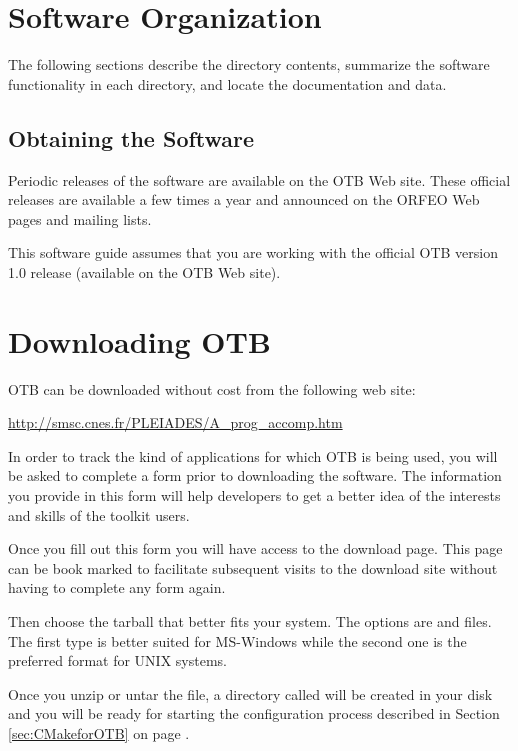 \section{Software Organization}
\label{sec:SoftwareOrganization}

The following sections describe the directory contents, summarize the
software functionality in each directory, and locate the documentation and
data.

\subsection{Obtaining the Software}
\label{sec:ObtainingTheSoftware}

Periodic releases of the software are available on the OTB Web
site. These official releases are available a few times a year and
announced on the ORFEO Web pages and mailing lists. 

This software guide assumes that you are working with the official OTB
version 1.0 release (available on the OTB Web site). %

\section{Downloading OTB}
\label{sec:DownloadingOTB}
 

OTB can be downloaded without cost from the following web site:
\begin{center} 
  \url{http://smsc.cnes.fr/PLEIADES/A_prog_accomp.htm}
\end{center}
In order to track the kind of applications for which OTB is being used, you
will be asked to complete a form prior to downloading the software.
The information you provide in this form will help developers to get a better
idea of the interests and skills of the toolkit users.

Once you fill out this form you will have access to the download
page. This page can be book marked to facilitate subsequent visits to
the download site without having to complete any form again.

 Then choose the tarball that better fits your system. The options
are  and  files.  The first type is better suited for
MS-Windows while the second one is the preferred format for UNIX systems.

Once you unzip or untar the file, a directory called  will be
created in your disk and you will be ready for starting the configuration
process described in Section \ref{sec:CMakeforOTB} on page 
\pageref{sec:CMakeforOTB}.


